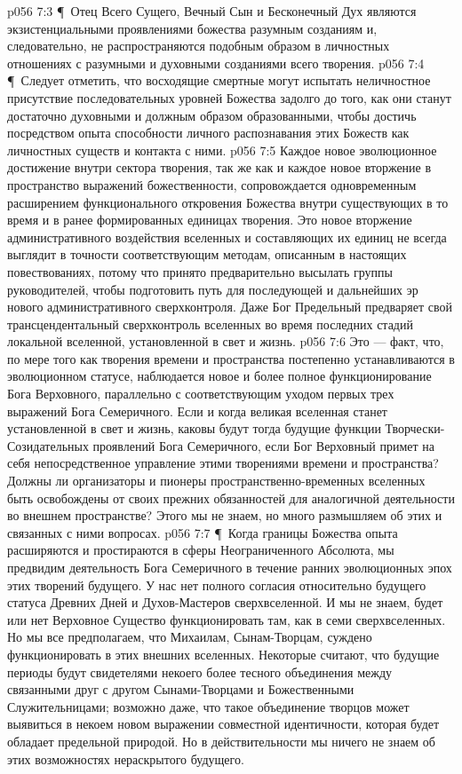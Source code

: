 \vs p056 7:3 \P\ Отец Всего Сущего, Вечный Сын и Бесконечный Дух являются экзистенциальными проявлениями божества разумным созданиям и, следовательно, не распространяются подобным образом в личностных отношениях с разумными и духовными созданиями всего творения.
\vs p056 7:4 \P\ Следует отметить, что восходящие смертные могут испытать неличностное присутствие последовательных уровней Божества задолго до того, как они станут достаточно духовными и должным образом образованными, чтобы достичь посредством опыта способности личного распознавания этих Божеств как личностных существ и контакта с ними.
\vs p056 7:5 Каждое новое эволюционное достижение внутри сектора творения, так же как и каждое новое вторжение в пространство выражений божественности, сопровождается одновременным расширением функционального откровения Божества внутри существующих в то время и в ранее формированных единицах творения. Это новое вторжение административного воздействия вселенных и составляющих их единиц не всегда выглядит в точности соответствующим методам, описанным в настоящих повествованиях, потому что принято предварительно высылать группы руководителей, чтобы подготовить путь для последующей и дальнейших эр нового административного сверхконтроля. Даже Бог Предельный предваряет свой трансцендентальный сверхконтроль вселенных во время последних стадий локальной вселенной, установленной в свет и жизнь.
\vs p056 7:6 Это --- факт, что, по мере того как творения времени и пространства постепенно устанавливаются в эволюционном статусе, наблюдается новое и более полное функционирование Бога Верховного, параллельно с соответствующим уходом первых трех выражений Бога Семеричного. Если и когда великая вселенная станет установленной в свет и жизнь, каковы будут тогда будущие функции Творчески\hyp{}Созидательных проявлений Бога Семеричного, если Бог Верховный примет на себя непосредственное управление этими творениями времени и пространства? Должны ли организаторы и пионеры пространственно\hyp{}временных вселенных быть освобождены от своих прежних обязанностей для аналогичной деятельности во внешнем пространстве? Этого мы не знаем, но много размышляем об этих и связанных с ними вопросах.
\vs p056 7:7 \P\ Когда границы Божества опыта расширяются и простираются в сферы Неограниченного Абсолюта, мы предвидим деятельность Бога Семеричного в течение ранних эволюционных эпох этих творений будущего. У нас нет полного согласия относительно будущего статуса Древних Дней и Духов\hyp{}Мастеров сверхвселенной. И мы не знаем, будет или нет Верховное Существо функционировать там, как в семи сверхвселенных. Но мы все предполагаем, что Михаилам, Сынам\hyp{}Творцам, суждено функционировать в этих внешних вселенных. Некоторые считают, что будущие периоды будут свидетелями некоего более тесного объединения между связанными друг с другом Сынами\hyp{}Творцами и Божественными Служительницами; возможно даже, что такое объединение творцов может выявиться в некоем новом выражении совместной идентичности, которая будет обладает предельной природой. Но в действительности мы ничего не знаем об этих возможностях нераскрытого будущего.
